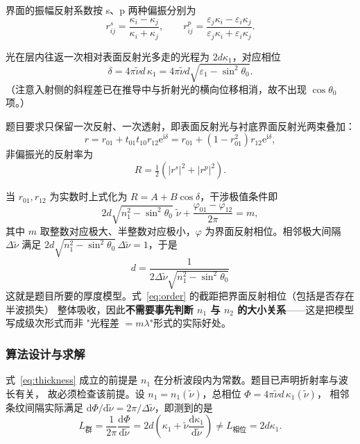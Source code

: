 \documentclass[12pt]{article}
\begin{document}
界面的振幅反射系数按 s、p 两种偏振分别为
\begin{equation}
  r_{ij}^{s}=\frac{\kappa_i-\kappa_j}{\kappa_i+\kappa_j},\qquad
  r_{ij}^{p}=\frac{\varepsilon_j\kappa_i-\varepsilon_i\kappa_j}{\varepsilon_j\kappa_i+\varepsilon_i\kappa_j} .
\end{equation}

光在层内往返一次相对表面反射光多走的光程为 $2d\kappa_1$，对应相位
\begin{equation}
  \delta=4\pi\tilde\nu d\,\kappa_1=4\pi\tilde\nu d\sqrt{\varepsilon_1-\sin^2\theta_0} .
\end{equation}
（注意入射侧的斜程差已在推导中与折射光的横向位移相消，故不出现 $\cos\theta_0$ 项。）

题目要求只保留一次反射、一次透射，即表面反射光与衬底界面反射光两束叠加：
\begin{equation}
  r=r_{01}+t_{01}t_{10}r_{12}\mathrm{e}^{\mathrm{i}\delta}
   =r_{01}+(1-r_{01}^{2})r_{12}\mathrm{e}^{\mathrm{i}\delta},
\end{equation}
非偏振光的反射率为
\begin{equation}
  R=\tfrac{1}{2}\left(|r^{s}|^{2}+|r^{p}|^{2}\right).
\end{equation}

当 $r_{01},r_{12}$ 为实数时上式化为 $R=A+B\cos\delta$，干涉极值条件即
\begin{equation}
  2d\sqrt{n_1^2-\sin^2\theta_0}\;\tilde\nu+\frac{\varphi_{01}-\varphi_{12}}{2\pi}=m ,
  \label{eq:order}
\end{equation}
其中 $m$ 取整数对应极大、半整数对应极小，$\varphi$ 为界面反射相位。相邻极大间隔 $\Delta\tilde\nu$
满足 $2d\sqrt{n_1^2-\sin^2\theta_0}\,\Delta\tilde\nu=1$，于是
\begin{equation}
  \boxed{\;d=\frac{1}{2\Delta\tilde\nu\sqrt{n_1^2-\sin^2\theta_0}}\;}
  \label{eq:thickness}
\end{equation}
这就是题目所要的厚度模型。式~\eqref{eq:order} 的截距把界面反射相位（包括是否存在半波损失）
整体吸收，因此\textbf{不需要事先判断 $n_1$ 与 $n_2$ 的大小关系}——这是把模型写成级次形式而非
"光程差 $=m\lambda$"形式的实际好处。

\subsubsection{算法设计与求解}

式~\eqref{eq:thickness} 成立的前提是 $n_1$ 在分析波段内为常数。题目已声明折射率与波长有关，
故必须检查该前提。设 $n_1=n_1(\tilde\nu)$，总相位 $\Phi=4\pi\tilde\nu d\,\kappa_1(\tilde\nu)$，
相邻条纹间隔实际满足 $\mathrm{d}\Phi/\mathrm{d}\tilde\nu=2\pi/\Delta\tilde\nu$，即测到的是
\begin{equation}
  L_{\text{群}}=\frac{1}{2\pi}\frac{\mathrm{d}\Phi}{\mathrm{d}\tilde\nu}
  =2d\left(\kappa_1+\tilde\nu\frac{\mathrm{d}\kappa_1}{\mathrm{d}\tilde\nu}\right)
  \neq L_{\text{相位}}=2d\kappa_1 .
  \label{eq:group}
\end{equation}
\end{document}
